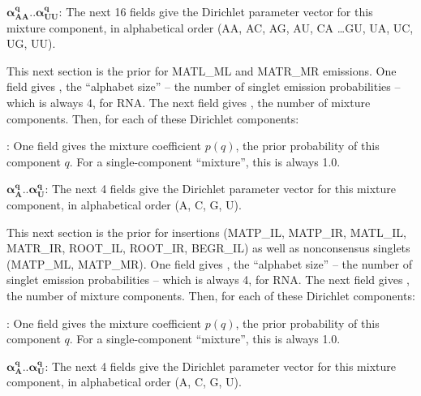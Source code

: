 \begin{description}
\begin{description}
     \item{$\mathbf{\alpha^q_{AA}..\alpha^q_{UU}}$:} The next 16 fields give the
     Dirichlet parameter vector for this mixture component, in alphabetical
     order (AA, AC, AG, AU, CA \ldots GU, UA, UC, UG, UU). 
     \end{description}

\item[\textbf{Consensus singlet base emission prior section.}] This
  next section is the prior for MATL\_ML and MATR\_MR emissions.  One
  field gives , the ``alphabet size'' -- the number of
  singlet emission probabilities -- which is always 4, for RNA.  The
  next field gives , the number of mixture components. Then,
  for each of these  Dirichlet components:
     \begin{description}
     \item{:} One field gives the mixture coefficient $p(q)$,
     the prior probability of this component $q$. For a single-component
     ``mixture'', this is always 1.0.

     \item{$\mathbf{\alpha^q_A..\alpha^q_U}$:} The next 4 fields give the
     Dirichlet parameter vector for this mixture component, in alphabetical
     order (A, C, G, U).
     \end{description}
  
\item[\textbf{Nonconsensus singlet base emission prior section.}] This
  next section is the prior for insertions (MATP\_IL, MATP\_IR,
  MATL\_IL, MATR\_IR, ROOT\_IL, ROOT\_IR, BEGR\_IL) as well as
  nonconsensus singlets (MATP\_ML, MATP\_MR). 
  One field gives , the ``alphabet size'' -- the number of
  singlet emission probabilities -- which is always 4, for RNA. 
  The next field gives , the
  number of mixture components. Then, for each of these 
  Dirichlet components:
     \begin{description}
     \item{:} One field gives the mixture coefficient $p(q)$,
     the prior probability of this component $q$. For a single-component
     ``mixture'', this is always 1.0.

     \item{$\mathbf{\alpha^q_A..\alpha^q_U}$:} The next 4 fields give the
     Dirichlet parameter vector for this mixture component, in alphabetical
     order (A, C, G, U).
     \end{description}
\end{description}


